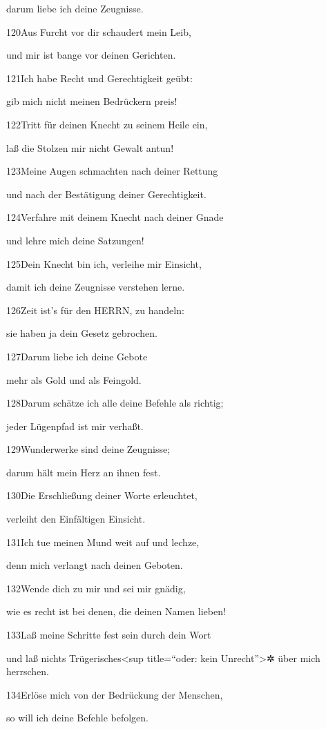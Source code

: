 darum liebe ich deine Zeugnisse.

120Aus Furcht vor dir schaudert mein Leib,

und mir ist bange vor deinen Gerichten.

121Ich habe Recht und Gerechtigkeit geübt:

gib mich nicht meinen Bedrückern preis!

122Tritt für deinen Knecht zu seinem Heile ein,

laß die Stolzen mir nicht Gewalt antun!

123Meine Augen schmachten nach deiner Rettung

und nach der Bestätigung deiner Gerechtigkeit.

124Verfahre mit deinem Knecht nach deiner Gnade

und lehre mich deine Satzungen!

125Dein Knecht bin ich, verleihe mir Einsicht,

damit ich deine Zeugnisse verstehen lerne.

126Zeit ist's für den HERRN, zu handeln:

sie haben ja dein Gesetz gebrochen.

127Darum liebe ich deine Gebote

mehr als Gold und als Feingold.

128Darum schätze ich alle deine Befehle als richtig;

jeder Lügenpfad ist mir verhaßt.

129Wunderwerke sind deine Zeugnisse;

darum hält mein Herz an ihnen fest.

130Die Erschließung deiner Worte erleuchtet,

verleiht den Einfältigen Einsicht.

131Ich tue meinen Mund weit auf und lechze,

denn mich verlangt nach deinen Geboten.

132Wende dich zu mir und sei mir gnädig,

wie es recht ist bei denen, die deinen Namen lieben!

133Laß meine Schritte fest sein durch dein Wort

und laß nichts Trügerisches\textless sup title=``oder: kein
Unrecht''\textgreater✲ über mich herrschen.

134Erlöse mich von der Bedrückung der Menschen,

so will ich deine Befehle befolgen.

